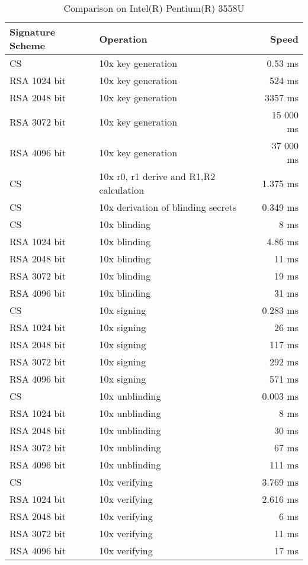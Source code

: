 \begin{table}[ht]
    \centering
    \setupBfhTabular
    \begin{tabular}{llr}
        \rowcolor{BFH-tablehead}
        \textbf{Signature Scheme} & \textbf{Operation} & \textbf{Speed} \\\hline
        CS & 10x key generation & 0.53 ms \\\hline
        RSA 1024 bit & 10x key generation & 524 ms \\\hline
        RSA 2048 bit & 10x key generation & 3357 ms \\\hline
        RSA 3072 bit & 10x key generation & 15 000 ms \\\hline
        RSA 4096 bit & 10x key generation & 37 000 ms \\\hline
        \hline
        CS & 10x r0, r1 derive and R1,R2 calculation & 1.375 ms \\\hline
        CS & 10x derivation of blinding secrets & 0.349 ms \\\hline
        CS & 10x blinding & 8 ms \\\hline
        RSA 1024 bit & 10x blinding & 4.86 ms \\\hline
        RSA 2048 bit & 10x blinding & 11 ms \\\hline
        RSA 3072 bit & 10x blinding & 19 ms \\\hline
        RSA 4096 bit & 10x blinding & 31 ms \\\hline
        \hline
        CS & 10x signing &  0.283 ms \\\hline
        RSA 1024 bit & 10x signing & 26 ms \\\hline
        RSA 2048 bit & 10x signing & 117 ms \\\hline
        RSA 3072 bit & 10x signing & 292 ms \\\hline
        RSA 4096 bit & 10x signing & 571 ms \\\hline
        \hline
        CS & 10x unblinding & 0.003 ms \\\hline
        RSA 1024 bit & 10x unblinding & 8 ms \\\hline
        RSA 2048 bit & 10x unblinding & 30 ms \\\hline
        RSA 3072 bit & 10x unblinding & 67 ms \\\hline
        RSA 4096 bit & 10x unblinding & 111 ms \\\hline
        \hline
        CS & 10x verifying & 3.769 ms \\\hline
        RSA 1024 bit & 10x verifying & 2.616 ms \\\hline
        RSA 2048 bit & 10x verifying & 6 ms \\\hline
        RSA 3072 bit & 10x verifying & 11 ms \\\hline
        RSA 4096 bit & 10x verifying & 17 ms \\\hline
    \end{tabular}
    \caption{Comparison on Intel(R) Pentium(R) 3558U}
    \label{tab:comp-sign-intel-pentium}
\end{table}


